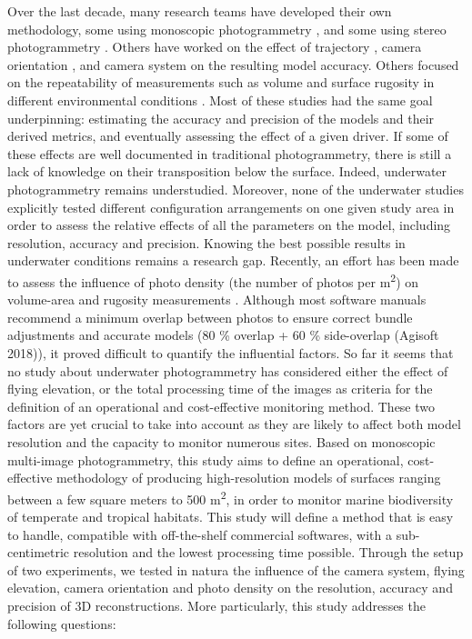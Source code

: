 Over the last decade, many research teams have developed their own methodology, some using monoscopic photogrammetry \citep{figueira_accuracy_2015, gutierrez-heredia_simple_2015, burns_integrating_2015,burns_utilizing_2015, burns_assessing_2016}, and some using stereo photogrammetry \citep{abdo_efficiently_2006, bryson_characterization_2017, pizarro_simple_2017, ferrari_quantifying_2016}. Others have worked on the effect of trajectory \citep{pizarro_simple_2017}, camera orientation \citep{chiabrando_influence_2017, raczynski_accuracy_2017}, and camera system \citep{guo_accuracy_2016} on the resulting model accuracy. Others focused on the repeatability of measurements such as volume \citep{lavy_quick_2015} and surface rugosity in different environmental conditions \citep{bryson_characterization_2017}. Most of these studies had the same goal underpinning: estimating the accuracy and precision of the models and their derived metrics, and eventually assessing the effect of a given driver. If some of these effects are well documented in traditional photogrammetry, there is still a lack of knowledge on their transposition below the surface. Indeed, underwater photogrammetry remains understudied. Moreover, none of the underwater studies explicitly tested different configuration arrangements on one given study area in order to assess the relative effects of all the parameters on the model, including resolution, accuracy and precision. Knowing the best possible results in underwater conditions remains a research gap. Recently, an effort has been made to assess the influence of photo density (the number of photos per m\textsuperscript{2}) on volume-area \citep{raoult_how_2017} and rugosity measurements \citep{bryson_characterization_2017}. Although most software manuals recommend a minimum overlap between photos to ensure correct bundle adjustments and accurate models (80 \% overlap + 60 \% side-overlap (Agisoft 2018)), it proved difficult to quantify the influential factors. So far it seems that no study about underwater photogrammetry has considered either the effect of flying elevation, or the total processing time of the images as criteria for the definition of an operational and cost-effective monitoring method. These two factors are yet crucial to take into account as they are likely to affect both model resolution and the capacity to monitor numerous sites.
Based on monoscopic multi-image photogrammetry, this study aims to define an operational, cost-effective methodology of producing high-resolution models of surfaces ranging between a few square meters to 500 m\textsuperscript{2}, in order to monitor marine biodiversity of temperate and tropical habitats. This study will define a method that is easy to handle, compatible with off-the-shelf commercial softwares, with a sub-centimetric resolution and the lowest processing time possible. Through the setup of two experiments, we tested in natura the influence of the camera system, flying elevation, camera orientation and photo density on the resolution, accuracy and precision of 3D reconstructions. More particularly, this study addresses the following questions:

